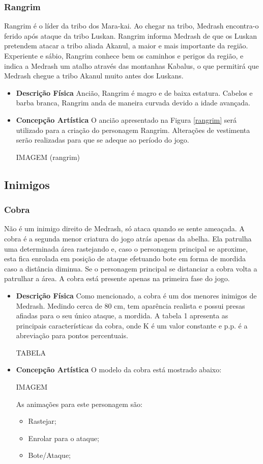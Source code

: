\subsubsection{Rangrim}
Rangrim é o líder da tribo dos Mara-kai. Ao chegar na tribo, Medrash
 encontra-o ferido após ataque da tribo Luskan. Rangrim informa Medrash de
 que os Luskan pretendem atacar a tribo aliada Akanul, a maior e mais
 importante da região. Experiente e sábio, Rangrim conhece bem os caminhos
 e perigos da região, e indica a Medrash um atalho através das montanhas
 Kabalus, o que permitirá que Medrash chegue a tribo Akanul muito antes dos
 Luskans.
\begin{itemize}
\item {\bf Descrição Física}
Ancião, Rangrim é magro e de baixa estatura. Cabelos e barba branca,
 Rangrim anda de maneira curvada devido a idade avançada.
\item {\bf Concepção Artística}
O ancião apresentado na Figura \ref{rangrim} será utilizado para a criação
 do personagem Rangrim. Alterações de vestimenta serão realizadas para que
 se adeque ao período do jogo.

IMAGEM (rangrim)

\end{itemize}
\subsection{Inimigos}
\subsubsection{Cobra}
Não é um inimigo direito de Medrash, só ataca quando se sente ameaçada. A
 cobra é a segunda menor criatura do jogo atrás apenas da abelha. Ela
 patrulha uma determinada área rastejando e, caso o personagem principal se
 aproxime, esta fica enrolada em posição de ataque efetuando bote em forma
 de mordida caso a distância diminua. Se o personagem principal se
 distanciar a cobra volta a patrulhar a área. A cobra está presente apenas
 na primeira fase do jogo.
\begin{itemize}
\item {\bf Descrição Física}
Como mencionado, a cobra é um dos menores inimigos de Medrash. Medindo
 cerca de 80 cm, tem aparência realista e possui presas afiadas para o seu
 único ataque, a mordida. A tabela 1 apresenta as principais
 características da cobra, onde K é um valor constante e p.p. é a
 abreviação para pontos percentuais.

TABELA

\item {\bf Concepção Artística}
O modelo da cobra está mostrado abaixo:

IMAGEM

As animações para este personagem são:
\begin{itemize}
\item Rastejar;
\item Enrolar para o ataque;
\item Bote/Ataque;
\end{itemize}
\end{itemize}

